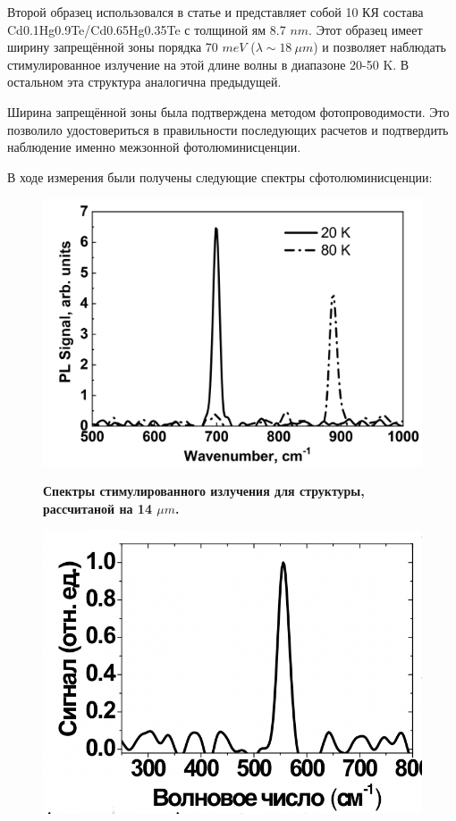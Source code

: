 \documentclass[../main.tex]{subfiles}
\begin{document}
    Второй образец использовался в статье \cite{Utochkin:PTS:2019} и представляет собой 10 КЯ состава Cd0.1Hg0.9Te/Cd0.65Hg0.35Te
    с толщиной ям 8.7 $nm$.
    Этот образец имеет ширину запрещённой зоны порядка 70 $meV$ ($\lambda \sim 18~\mu m$) и позволяет наблюдать стимулированное 
    излучение на этой длине волны в диапазоне  20-50 K. В остальном эта структура аналогична предыдущей.

    Ширина запрещённой зоны была подтверждена методом фотопроводимости. Это позволило удостовериться в правильности последующих 
    расчетов и подтвердить наблюдение именно межзонной фотолюминисценции.

    В ходе измерения были получены следующие спектры сфотолюминисценции:

    \begin{figure}[h]
        \vspace{0.75cm}
        \begin{minipage}[h]{\linewidth}
            \begin{center}
                \includegraphics[width=0.75\linewidth]{./images/spectre_14um.png}
    
                \vspace{0.75cm}
                \textbf{Спектры стимулированного излучения для структуры, 
                    рассчитаной на 14 $\mu m$.}
                \vspace{0.75cm}
            \end{center}
        \end{minipage}
        \begin{minipage}[h]{\linewidth}
            \begin{center}
                \includegraphics[width=0.75\linewidth]{./images/spectre_18um.png}
    

\end{center}
\end{minipage}
\end{figure}
\end{document}
